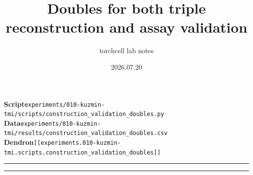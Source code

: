 \documentclass[pdflatex,sn-nature,Numbered]{sn-jnl}
\title{Doubles for both triple reconstruction and assay validation}
\author{torchcell lab notes}
\date{2026.07.20}
\begin{document}
\maketitle

{\small
\noindent\textbf{Script}\quad \texttt{experiments/010-kuzmin-tmi/scripts/construction\_validation\_doubles.py}\\
\noindent\textbf{Data}\quad \texttt{experiments/010-kuzmin-tmi/results/construction\_validation\_doubles.csv}\\
\noindent\textbf{Dendron}\quad \texttt{[[experiments.010-kuzmin-tmi.scripts.construction\_validation\_doubles]]}
}

\vspace{1em}
\hrule
\tableofcontents
\hrule
\vspace{1em}












\end{document}
